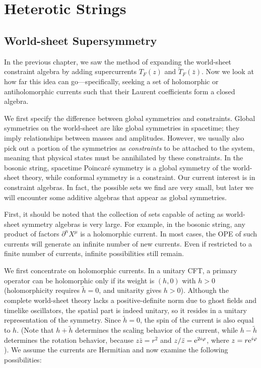 \chapter{\texorpdfstring{Heterotic Strings}{11 Heterotic Strings}} \label{cha:11}

\section{World-sheet Supersymmetry} \label{sec:11.1}

In the previous chapter, we saw the method of expanding the world-sheet constraint algebra by adding supercurrents $T_{F}(z)$ and $\tilde{T}_{F}(\bar{z})$. Now we look at how far this idea can go—specifically, seeking a set of holomorphic or antiholomorphic currents such that their Laurent coefficients form a closed algebra.

We first specify the difference between global symmetries and constraints. Global symmetries on the world-sheet are like global symmetries in spacetime; they imply relationships between masses and amplitudes. However, we usually also pick out a portion of the symmetries as \emph{constraints} to be attached to the system, meaning that physical states must be annihilated by these constraints. In the bosonic string, spacetime Poincaré symmetry is a global symmetry of the world-sheet theory, while conformal symmetry is a constraint. Our current interest is in constraint algebras. In fact, the possible sets we find are very small, but later we will encounter some additive algebras that appear as global symmetries.

First, it should be noted that the collection of sets capable of acting as world-sheet symmetry algebras is very large. For example, in the bosonic string, any product of factors $\partial^{n}X^{\mu}$ is a holomorphic current. In most cases, the OPE of such currents will generate an infinite number of new currents. Even if restricted to a finite number of currents, infinite possibilities still remain.

We first concentrate on holomorphic currents. In a unitary CFT, a primary operator can be holomorphic only if its weight is $(h,0)$ with $h>0$ (holomorphicity requires $\tilde{h}=0$, and unitarity gives $h>0$). Although the complete world-sheet theory lacks a positive-definite norm due to ghost fields and timelike oscillators, the spatial part is indeed unitary, so it resides in a unitary representation of the symmetry. Since $\tilde{h}=0$, the spin of the current is also equal to $h$. (Note that $h+\tilde{h}$ determines the scaling behavior of the current, while $h-\tilde{h}$ determines the rotation behavior, because $z\bar{z}=r^{2}$ and $z/\bar{z}=\mathrm{e}^{2i\varphi}$, where $z=r\mathrm{e}^{i\varphi}$). We assume the currents are Hermitian and now examine the following possibilities:

